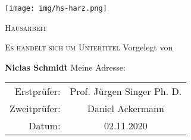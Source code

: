 \begin{center}
    \texttt{[image: img/hs-harz.png]}

    \vspace{20mm}

    \Huge
    \textsc{Hausarbeit}

    \vspace{5mm}

    \Large
    \textsc{Es handelt sich um Untertitel}
    \normalsize
    \vfill
    Vorgelegt von

    \textbf{Niclas Schmidt}
    Meine Adresse:

    \vspace{20mm}

    \begin{tabular}{r c}
        Erstprüfer: & Prof. Jürgen Singer Ph. D.\\
        Zweitprüfer: & Daniel Ackermann \\
        Datum: & 02.11.2020
    \end{tabular}
    
    \vspace{5mm}
\end{center}
